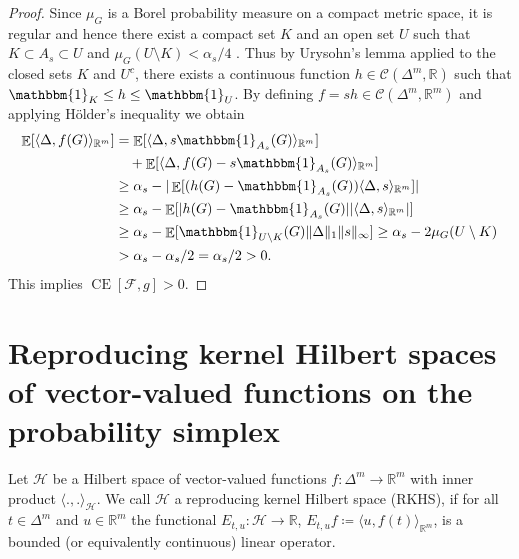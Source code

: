 \documentclass{article}
\DeclareMathOperator{\Expect}{\mathbb{E}}
\DeclareMathOperator{\measure}{CE}
\begin{document}
\begin{proof}
  Since $\mu_G$ is a Borel probability measure on a compact metric space, it is
  regular and hence there exist a compact set $K$ and an open set $U$ such that
  $K \subset A_s \subset U$ and $\mu_G(U \setminus K) < \alpha_s / 4$
  \citep[Theorem~2.17]{rudin86_real}. Thus by Urysohn's lemma applied to the
  closed sets $K$ and $U^c$, there exists a continuous function
  $h \in \mathcal{C}(\Delta^m, \mathbb{R})$ such that
  $\mathbbm{1}_K \leq h \leq \mathbbm{1}_U$. By defining
  $f = sh \in \mathcal{C}(\Delta^m, \mathbb{R}^m)$ and applying Hölder's
  inequality we obtain
  \begin{equation*}
    \begin{split}
      \Expect[\langle \Delta, f(G) \rangle_{\mathbb{R}^m}] &= \Expect[\langle \Delta, s\mathbbm{1}_{A_s}(G) \rangle_{\mathbb{R}^m}] \\
      &\quad + \Expect[\langle \Delta, f(G) - s\mathbbm{1}_{A_s}(G) \rangle_{\mathbb{R}^m}] \\
      &\geq \alpha_s - |\Expect[(h(G) - \mathbbm{1}_{A_s}(G)) \langle \Delta, s \rangle_{\mathbb{R}^m}]| \\
      &\geq \alpha_s - \Expect[|h(G) - \mathbbm{1}_{A_s}(G)| |\langle \Delta, s \rangle_{\mathbb{R}^m}|] \\
      &\geq \alpha_s - \Expect[\mathbbm{1}_{U \setminus K}(G) \|\Delta\|_1 \|s\|_{\infty}] \geq \alpha_s - 2 \mu_G(U\setminus K) \\
      &> \alpha_s - \alpha_s/2 = \alpha_s/2 > 0.
    \end{split}
  \end{equation*}
  This implies $\measure[\mathcal{F}, g] > 0$.
\end{proof}

\section{Reproducing kernel Hilbert spaces of vector-valued functions on the probability simplex}\label{app:rkhs}

\begin{definition}\label{def:rkhs}
  Let $\mathcal{H}$ be a Hilbert space of vector-valued functions
  $f \colon \Delta^m \to \mathbb{R}^m$ with inner product
  $\langle ., . \rangle_{\mathcal{H}}$. We call $\mathcal{H}$ a reproducing
  kernel Hilbert space (RKHS), if for all $t \in \Delta^m$ and
  $u \in \mathbb{R}^m$ the functional $E_{t,u} \colon \mathcal{H} \to \mathbb{R}$,
  $E_{t,u} f \coloneqq \langle u, f(t) \rangle_{\mathbb{R}^m}$, is a bounded (or
  equivalently continuous) linear operator.
\end{definition}
\end{document}
